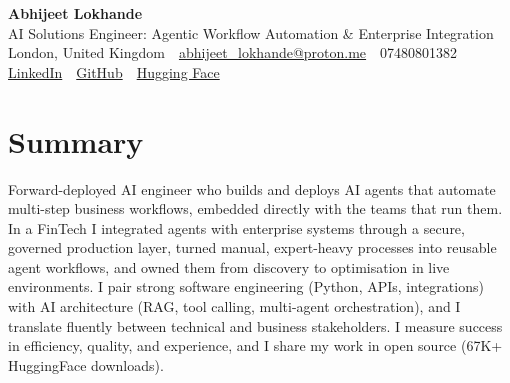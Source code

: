 \documentclass[10pt,a4paper]{article}
\newcommand{\sep}{\,\textcolor{accent!60}{\textbar}\,}
\begin{document}
\begin{center}
  {\fontsize{24}{26}\selectfont\bfseries Abhijeet Lokhande}\\[3pt]
  {\color{accent}\large AI Solutions Engineer: Agentic Workflow Automation \& Enterprise Integration}\\[5pt]
  {\small
    London, United Kingdom \sep
    \href{mailto:abhijeet_lokhande@proton.me}{abhijeet\_lokhande@proton.me} \sep
    07480801382 \\[2pt]
    \href{https://www.linkedin.com/in/ablds/}{LinkedIn} \sep
    \href{https://github.com/abhijeetscode}{GitHub} \sep
    \href{https://huggingface.co/ab-ai}{Hugging Face}
  }
\end{center}
\vspace{2pt}

\section{Summary}
Forward-deployed AI engineer who builds and deploys AI agents that automate multi-step business workflows, embedded directly with the teams that run them. In a FinTech I integrated agents with enterprise systems through a secure, governed production layer, turned manual, expert-heavy processes into reusable agent workflows, and owned them from discovery to optimisation in live environments. I pair strong software engineering (Python, APIs, integrations) with AI architecture (RAG, tool calling, multi-agent orchestration), and I translate fluently between technical and business stakeholders. I measure success in efficiency, quality, and experience, and I share my work in open source (67K+ HuggingFace downloads).

\end{document}
